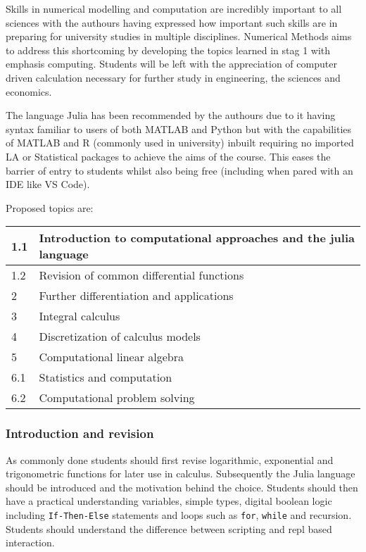 \documentclass[12pt]{report}
\begin{document}
    Skills in numerical modelling and computation are incredibly important to all sciences with the authours having expressed  how important such skills are in preparing for university studies in multiple disciplines. Numerical Methods aims to address this shortcoming by developing the topics learned in stag 1 with emphasis computing. Students will be left with the appreciation of computer driven calculation necessary for further study in engineering, the sciences and economics.


    The language Julia has been recommended by the authours due to it having syntax familiar to users of both MATLAB and Python but with the capabilities of MATLAB and R (commonly used in university) inbuilt requiring no imported LA or Statistical packages to achieve the aims of the course. This eases the barrier of entry to students whilst also being free (including when pared with an IDE like VS Code).

    Proposed topics are:
    \begin{table}[H]
        \centering
        \begin{tabular}{|l|l|}
        \hline
            1.1 & Introduction to computational approaches and the julia language\\ \hline
            1.2 & Revision of common differential functions\\ \hline
            2 & Further differentiation and applications \\ \hline
            3 & Integral calculus \\ \hline
            4 & Discretization of calculus models\\ \hline
            5 & Computational linear algebra \\ \hline
            6.1 & Statistics and computation \\ \hline
            6.2 & Computational problem solving \\ \hline
        \end{tabular}
    \end{table}

    \subsubsection{Introduction and revision} As commonly done students should first revise logarithmic, exponential and trigonometric functions for later use in calculus. Subsequently the Julia language should be introduced and the motivation behind the choice. Students should then have a practical understanding variables, simple types, digital boolean logic including \verb|If-Then-Else| statements and loops such as \verb|for|, \verb|while| and recursion. Students should understand the difference between scripting and repl based interaction.
    
\end{document}
